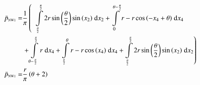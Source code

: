 \begin{align}
    \bar{p}_{\text{\tiny{NW1}}} =&\frac{1}{\pi} \left(\;\;\int\limits_{\frac{\theta}{2}}^{\frac{\pi}{2}}2 r \sin{\left (\frac{\theta}{2} \right )} \sin{\left (x_{2} \right )}\;\mathrm{d}x_{2}+\int\limits_{0}^{\theta - \frac{\pi}{2}}r - r \cos{\left (- x_{4} + \theta \right )}\;\mathrm{d}x_{4}\right.\notag\\
 &\left.+\int\limits_{\theta - \frac{\pi}{2}}^{\frac{\pi}{2}}r\;\mathrm{d}x_{4}+\int\limits_{\frac{\pi}{2}}^{\theta}r - r \cos{\left (x_{4} \right )}\;\mathrm{d}x_{4}+\int\limits_{\frac{\theta}{2}}^{\frac{\pi}{2}}2 r \sin{\left (\frac{\theta}{2} \right )} \sin{\left (x_{2} \right )}\;\mathrm{d}x_{2}\right)\label{pNW1Def}\\
    \bar{p}_{\text{\tiny{NW1}}}  =& \frac{r}{\pi} \left(\theta + 2\right)\label{pNW1Sln}
\end{align}